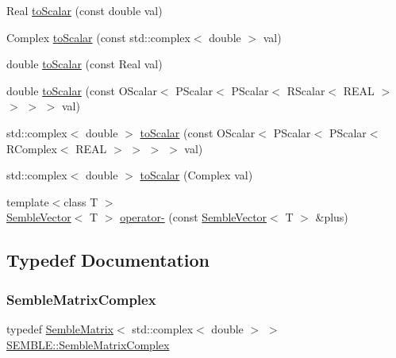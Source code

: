 \begin{DoxyCompactItemize}
\item 
Real \mbox{\hyperlink{namespaceSEMBLE_a1f42facef04bfb2c3d89c7a76b9c17d2}{to\+Scalar}} (const double val)
\item 
Complex \mbox{\hyperlink{namespaceSEMBLE_a29f729adf2ea4f15e9c4e7c11815c179}{to\+Scalar}} (const std\+::complex$<$ double $>$ val)
\item 
double \mbox{\hyperlink{namespaceSEMBLE_a0642469606d582b54e84fafac3673ea5}{to\+Scalar}} (const Real val)
\item 
double \mbox{\hyperlink{namespaceSEMBLE_a947496ec866f5b368db8503e3be29388}{to\+Scalar}} (const O\+Scalar$<$ P\+Scalar$<$ P\+Scalar$<$ R\+Scalar$<$ R\+E\+AL $>$ $>$ $>$ $>$ val)
\item 
std\+::complex$<$ double $>$ \mbox{\hyperlink{namespaceSEMBLE_af07f798289a04210dff858088b3b08d8}{to\+Scalar}} (const O\+Scalar$<$ P\+Scalar$<$ P\+Scalar$<$ R\+Complex$<$ R\+E\+AL $>$ $>$ $>$ $>$ val)
\item 
std\+::complex$<$ double $>$ \mbox{\hyperlink{namespaceSEMBLE_a5299b4682ac6826c96f30f68686dd5e0}{to\+Scalar}} (Complex val)
\item 
{\footnotesize template$<$class T $>$ }\\\mbox{\hyperlink{structSEMBLE_1_1SembleVector}{Semble\+Vector}}$<$ T $>$ \mbox{\hyperlink{namespaceSEMBLE_acb8d0c10fdb354c4ad2ff7a76fde06da}{operator-\/}} (const \mbox{\hyperlink{structSEMBLE_1_1SembleVector}{Semble\+Vector}}$<$ T $>$ \&plus)
\end{DoxyCompactItemize}


\subsection{Typedef Documentation}
\mbox{\label{namespaceSEMBLE_a8b417450e7274f86ee69dc99cd81fc85}} 
\subsubsection{\texorpdfstring{SembleMatrixComplex}{SembleMatrixComplex}}
{\footnotesize\ttfamily typedef \mbox{\hyperlink{structSEMBLE_1_1SembleMatrix}{Semble\+Matrix}}$<$ std\+::complex$<$ double $>$ $>$ \mbox{\hyperlink{namespaceSEMBLE_a8b417450e7274f86ee69dc99cd81fc85}{S\+E\+M\+B\+L\+E\+::\+Semble\+Matrix\+Complex}}}

\mbox{\label{namespaceSEMBLE_afdaf09320dfddbf64a27bf64b119b5c6}} 
